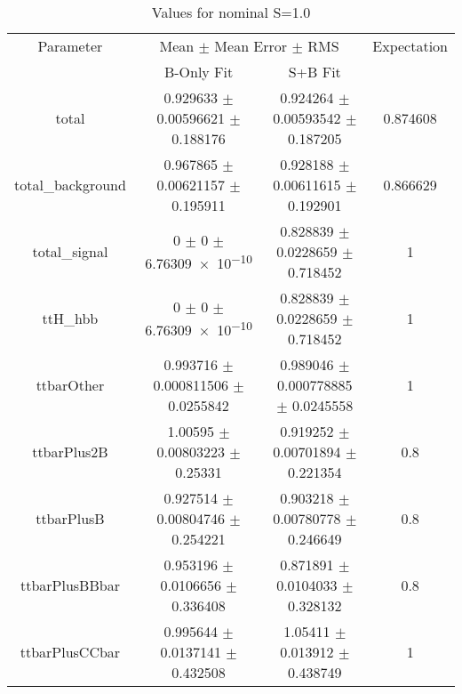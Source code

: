\begin{table}
\centering
\caption{Values for nominal S=1.0}
\begin{tabular}{cccc}
\toprule
Parameter & \multicolumn{2}{c}{Mean $\pm$ Mean Error $\pm$ RMS} & Expectation\\
 & B-Only Fit & S+B Fit & \\
\midrule
total & \num{0.929633} $\pm$ \num{0.00596621} $\pm$ \num{0.188176} & \num{0.924264} $\pm$ \num{0.00593542} $\pm$ \num{0.187205} & \num{0.874608}\\
total\_background & \num{0.967865} $\pm$ \num{0.00621157} $\pm$ \num{0.195911} & \num{0.928188} $\pm$ \num{0.00611615} $\pm$ \num{0.192901} & \num{0.866629}\\
total\_signal & \num{0} $\pm$ \num{0} $\pm$ \num{6.76309e-10} & \num{0.828839} $\pm$ \num{0.0228659} $\pm$ \num{0.718452} & \num{1}\\
ttH\_hbb & \num{0} $\pm$ \num{0} $\pm$ \num{6.76309e-10} & \num{0.828839} $\pm$ \num{0.0228659} $\pm$ \num{0.718452} & \num{1}\\
ttbarOther & \num{0.993716} $\pm$ \num{0.000811506} $\pm$ \num{0.0255842} & \num{0.989046} $\pm$ \num{0.000778885} $\pm$ \num{0.0245558} & \num{1}\\
ttbarPlus2B & \num{1.00595} $\pm$ \num{0.00803223} $\pm$ \num{0.25331} & \num{0.919252} $\pm$ \num{0.00701894} $\pm$ \num{0.221354} & \num{0.8}\\
ttbarPlusB & \num{0.927514} $\pm$ \num{0.00804746} $\pm$ \num{0.254221} & \num{0.903218} $\pm$ \num{0.00780778} $\pm$ \num{0.246649} & \num{0.8}\\
ttbarPlusBBbar & \num{0.953196} $\pm$ \num{0.0106656} $\pm$ \num{0.336408} & \num{0.871891} $\pm$ \num{0.0104033} $\pm$ \num{0.328132} & \num{0.8}\\
ttbarPlusCCbar & \num{0.995644} $\pm$ \num{0.0137141} $\pm$ \num{0.432508} & \num{1.05411} $\pm$ \num{0.013912} $\pm$ \num{0.438749} & \num{1}\\
\bottomrule
\end{tabular}
\end{table}
